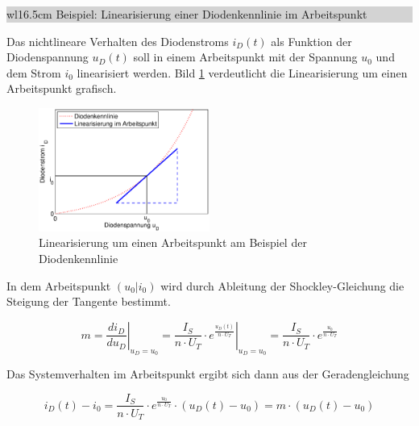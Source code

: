 \noindent
\colorbox{lightgray}{%
%
\renewcommand\arraystretch{0.6}%
\begin{tabular}{ wl{16.5cm} }
{\selectfont
{Beispiel: Linearisierung einer Diodenkennlinie im Arbeitspunkt}}
\end{tabular}%
}\bigskip

\noindent Das nichtlineare Verhalten des Diodenstroms $i_{D}(t)$  als Funktion der Diodenspannung $u_{D}(t)$ soll in einem Arbeitspunkt mit der Spannung $u_{0}$ und dem Strom $i_{0}$ linearisiert werden. Bild \ref{fig:Linearisierung} verdeutlicht die Linearisierung um einen Arbeitspunkt grafisch.\bigskip

\begin{figure}[H]
  \centerline{\includegraphics[width=0.5\textwidth]{Kapitel2/Bilder/image9}}
  \caption{Linearisierung um einen Arbeitspunkt am Beispiel der Diodenkennlinie}
  \label{fig:Linearisierung}
\end{figure}

\noindent In dem Arbeitspunkt $(u_{0}|i_{0})$ wird durch Ableitung der Shockley-Gleichung die Steigung der Tangente bestimmt.


\begin{equation}\label{eq:threethirtyeight}
m=\left. \frac{di_{D} }{du_{D} } \right|_{u_{D} =u_{0} } =\left. \frac{I_{S} }{n\cdot U_{T} } \cdot e^{\frac{u_{D} \left(t\right)}{n\cdot U_{T} } } \right|_{u_{D} =u_{0} } =\frac{I_{S} }{n\cdot U_{T} } \cdot e^{\frac{u_{0} }{n\cdot U_{T} } }
\end{equation}

\noindent Das Systemverhalten im Arbeitspunkt ergibt sich dann aus der Geradengleichung


\begin{equation}\label{eq:threethirtynine}
i_{D} \left(t\right)-i_{0} =\frac{I_{S} }{n\cdot U_{T} } \cdot e^{\frac{u_{0} }{n\cdot U_{T} } } \cdot \left(u_{D} \left(t\right)-u_{0} \right)=m\cdot \left(u_{D} \left(t\right)-u_{0} \right)
\end{equation}

